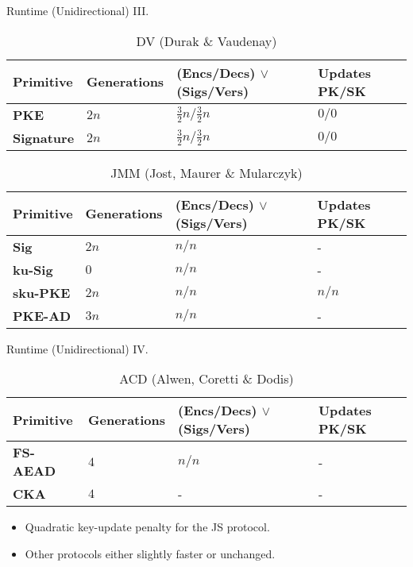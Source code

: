 \documentclass{beamer}
\begin{document}
\begin{frame}{Runtime (Unidirectional) III.}
  \scriptsize
  \begin{table}
    \caption*{DV (Durak \& Vaudenay)}
    \begin{tabular}{ | l | l | l | l |}
    \hline
    Primitive & Generations & (Encs/Decs) $\vee$ (Sigs/Vers) & Updates PK/SK \\ \hline
    \textbf{PKE} & $2n$ & $\frac{3}{2}n/\frac{3}{2}n$ & $0/0$ \\ \hline
    \textbf{Signature} & $2n$ & $\frac{3}{2}n/\frac{3}{2}n$ & $0/0$ \\  
    \hline
    \end{tabular}
  \end{table}
  \begin{table}
    \caption*{JMM (Jost, Maurer \& Mularczyk)}
    \begin{tabular}{ | l | l | l | l |}
    \hline
    Primitive & Generations & (Encs/Decs) $\vee$ (Sigs/Vers) & Updates PK/SK \\ \hline
    \textbf{Sig} & $2n$ & $n/n$ & - \\ \hline
    \textbf{ku-Sig} & $0$ & $n/n$ & - \\ \hline
    \textbf{sku-PKE} & $2n$ & $n/n$ & $n/n$ \\ \hline
    \textbf{PKE-AD} & $3n$ & $n/n$ & - \\
    \hline
    \end{tabular}
  \end{table}
\end{frame}

\begin{frame}{Runtime (Unidirectional) IV.}
  \scriptsize
  \begin{table}
    \caption*{ACD (Alwen, Coretti \& Dodis)}
    \begin{tabular}{ | l | l | l | l |}
    \hline
    Primitive & Generations & (Encs/Decs) $\vee$ (Sigs/Vers) & Updates PK/SK \\ \hline
    \textbf{FS-AEAD} & $4$ & $n/n$ & - \\ \hline
    \textbf{CKA} & $4$ & - & - \\  
    \hline
    \end{tabular}
  \end{table}
  \normalsize
  \begin{itemize}
  \item Quadratic key-update penalty for the JS protocol.
  \item Other protocols either slightly faster or unchanged.
  \end{itemize}
\end{frame}
\end{document}
